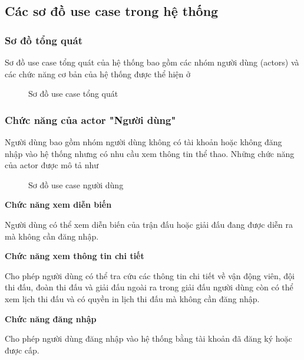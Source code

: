 \subsection{Các sơ đồ use case trong hệ thống}
\setcounter{subsubsection}{0}
\setcounter{figure}{0}

% 

\subsubsection{Sơ đồ tổng quát}
Sơ đồ use case tổng quát của hệ thống bao gồm các nhóm người dùng
(actors) và các chức năng cơ bản của hệ thống được thể hiện ở 

\begin{figure}[H]
  \centering
  
  \caption{Sơ đồ use case tổng quát}
  \label{fig:uc-1}
\end{figure}

\subsubsection{Chức năng của actor "Người dùng"}
Người dùng bao gồm nhóm người dùng không có tài khoản hoặc không đăng nhập vào hệ thống nhưng có nhu cầu xem thông tin thể thao. Những chức năng của actor được mô tả như

\begin{figure}[H]
  \centering
  
  \caption{Sơ đồ use case người dùng}
  \label{fig:uc-2}
\end{figure}

\noindent
\textbf{Chức năng xem diễn biến}

Người dùng có thể xem diễn biến của trận đấu hoặc giải đấu đang được diễn ra mà
không cần đăng nhập.

\noindent
\textbf{Chức năng xem thông tin chi tiết}

Cho phép người dùng có thể tra cứu các thông tin chi tiết về vận động viên,
đội thi đấu, đoàn thi đấu và giải đấu ngoài ra trong giải đấu người dùng còn có
thể xem lịch thi đấu và có quyền in lịch thi đấu mà không cần đăng nhập.

\noindent
\textbf{Chức năng đăng nhập}

Cho phép người dùng đăng nhập vào hệ thống bằng tài khoản đã đăng ký hoặc được cấp.

